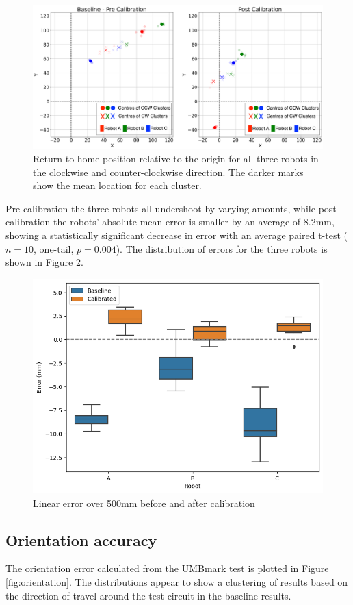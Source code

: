 \documentclass[conference]{IEEEtran}
\begin{document}
\begin{figure}[h!]
    \centering
    \includegraphics[width=.85\textwidth]{img/xy_pre_post_2.png}
    \caption{Return to home position relative to the origin for all three robots in the clockwise and counter-clockwise direction. The darker marks show the mean location for each cluster.}
    \label{fig:xy_scatter}
\end{figure}

Pre-calibration the three robots all undershoot by varying amounts, while post-calibration the robots' absolute mean error is smaller by an average of 8.2mm, showing a statistically significant decrease in error with an average paired t-test ($n = 10$, one-tail, $p = 0.004$). The distribution of errors for the three robots is shown in Figure \ref{fig:linear}.


\begin{figure}[h]
    \centering
    \includegraphics[width=.49\textwidth]{img/linear_pre_post.png}
    \caption{Linear error over 500mm before and after calibration}
    \label{fig:linear}
\end{figure}

\subsection{Orientation accuracy}

The orientation error calculated from the UMBmark test is plotted in Figure \ref{fig:orientation}. The distributions appear to show a clustering of results based on the direction of travel around the test circuit in the baseline results.
\end{document}
